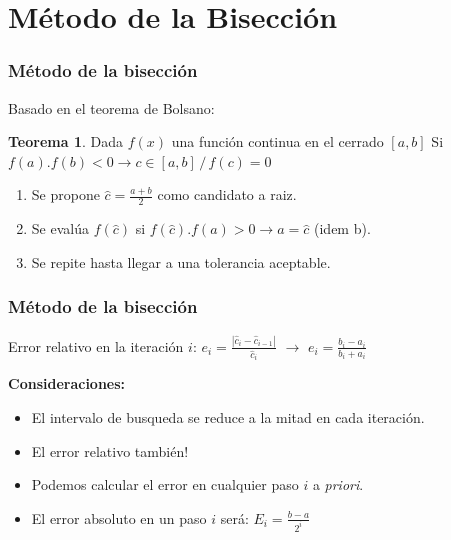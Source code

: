 \documentclass[xcolor=svgnames]{beamer} %
\theoremstyle{plain}
\renewcommand{\textbf}[1]{{\bfseries\textcolor{redUnq2}{#1}}}
\theoremstyle{definition}
\newtheorem{teor}{Teorema}
\begin{document}
\section{Método de la Bisección}
\begin{frame}
\frametitle{Método de la bisección}

Basado en el teorema de Bolsano:

\begin{tcolorbox}
\begin{teor}
	Dada $f(x)$ una función continua en el cerrado $[a,b]$ Si $f(a).f(b)<0 \rightarrow c \in [a,b]\, /\, f(c)=0$

\end{teor}
\end{tcolorbox}\vspace{12pt}

\begin{enumerate}
  \item Se propone $\hat c = \frac{a+b}{2} $ como candidato a raiz.
  \item Se evalúa $f(\hat c)$ si $f(\hat c).f(a)>0 \rightarrow  a=\hat c$ (idem b). 
  \item  Se repite hasta llegar a una tolerancia aceptable.
\end{enumerate}

\end{frame}

\begin{frame}
\frametitle{Método de la bisección}

Error relativo en la iteración $i$: $e_i = \frac{|\hat c_i-\hat c_{i-1}|}{\hat c_i} $ $\rightarrow$ $\boxed{ e_i= \frac{b_i-a_i}{b_i+a_i}}$\vspace{10pt}

\textbf{Consideraciones:}
\begin{itemize}
\item El intervalo de busqueda se reduce a la mitad en cada iteración.
\pause
\item El error relativo también!
\pause
\item Podemos calcular el error en cualquier paso $i$ a \textit{priori}.
\pause
\item El error absoluto en un paso $i$ será: $E_i = \frac{b-a}{2^i}$
\end{itemize}

\end{frame}
\end{document}
